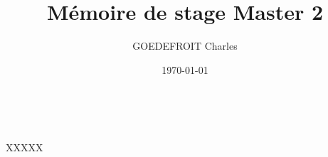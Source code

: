 \documentclass[11pt, a4paper]{article}
\title{Mémoire de stage Master 2}
\author{GOEDEFROIT Charles}
\date{\today}
\begin{document}
\begin{titlepage}
  \centering
  \ {} %
  \vfill
  \vspace{1cm}
  {\scshape\Huge\MyTitle\par}
  \vspace{0.5cm}
  {\LARGE\MySubject\par}
  \vspace{0.5cm}
  {\Large XXXXX\par}
  \vspace{1cm}
  \MyAuthor
  \vfill
  {\large\MyDate\par}
\end{titlepage}

\newpage

\tableofcontents

\newpage








% 



\renewcommand{\refname}{Bibliographie}
\let\Section\section
\def\section*#1{\Section{#1}}


\nocite{*}
\end{document}
